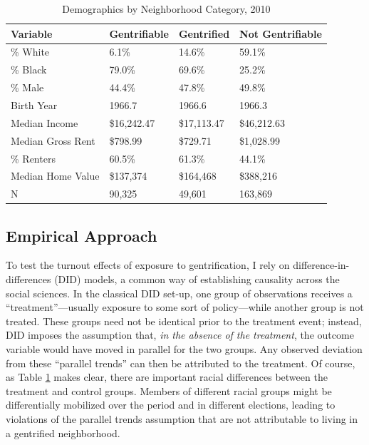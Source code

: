 \documentclass[
  12pt,
]{article}
\begin{document}
\begin{singlespace}
\begin{table}[!h]

\caption{\label{tab:pre-demo-tab-full}\label{tab:pre-demos} Demographics by Neighborhood Category, 2010}
\centering
\begin{tabular}[t]{llll}
\toprule
Variable & Gentrifiable & Gentrified & Not Gentrifiable\\
\midrule
\% White & 6.1\% & 14.6\% & 59.1\%\\
\% Black & 79.0\% & 69.6\% & 25.2\%\\
\% Male & 44.4\% & 47.8\% & 49.8\%\\
Birth Year & 1966.7 & 1966.6 & 1966.3\\
Median Income & \$16,242.47 & \$17,113.47 & \$46,212.63\\
Median Gross Rent & \$798.99 & \$729.71 & \$1,028.99\\
\% Renters & 60.5\% & 61.3\% & 44.1\%\\
Median Home Value & \$137,374 & \$164,468 & \$388,216\\
N & 90,325 & 49,601 & 163,869\\
\bottomrule
\end{tabular}
\end{table}
\end{singlespace}

\hypertarget{empirical-approach}{%
\subsection{Empirical Approach}\label{empirical-approach}}

To test the turnout effects of exposure to gentrification, I rely on difference-in-differences (DID) models, a common way of establishing causality across the social sciences. In the classical DID set-up, one group of observations receives a ``treatment''---usually exposure to some sort of policy---while another group is not treated. These groups need not be identical prior to the treatment event; instead, DID imposes the assumption that, \emph{in the absence of the treatment}, the outcome variable would have moved in parallel for the two groups. Any observed deviation from these ``parallel trends'' can then be attributed to the treatment. Of course, as Table \ref{tab:pre-demos} makes clear, there are important racial differences between the treatment and control groups. Members of different racial groups might be differentially mobilized over the period and in different elections, leading to violations of the parallel trends assumption that are not attributable to living in a gentrified neighborhood.
\end{document}
